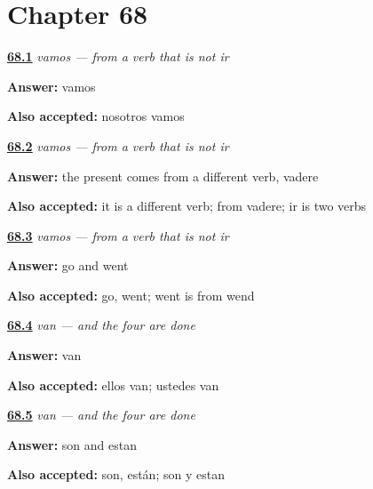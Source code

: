 \section*{Chapter 68}

\noindent\begin{minipage}[t]{\linewidth}
\raggedright
\hyperlink{review-ES-C10-vamos-form}{\textbf{68.1}} \emph{vamos — from a verb that is not \emph{ir}}\par
\small \textbf{Answer:} vamos\par
\footnotesize \textbf{Also accepted:} nosotros vamos
\end{minipage}\par\medskip

\noindent\begin{minipage}[t]{\linewidth}
\raggedright
\hyperlink{review-ES-C10-vamos-why}{\textbf{68.2}} \emph{vamos — from a verb that is not \emph{ir}}\par
\small \textbf{Answer:} the present comes from a different verb, vadere\par
\footnotesize \textbf{Also accepted:} it is a different verb; from vadere; ir is two verbs
\end{minipage}\par\medskip

\noindent\begin{minipage}[t]{\linewidth}
\raggedright
\hyperlink{review-ES-C10-vamos-english}{\textbf{68.3}} \emph{vamos — from a verb that is not \emph{ir}}\par
\small \textbf{Answer:} go and went\par
\footnotesize \textbf{Also accepted:} go, went; went is from wend
\end{minipage}\par\medskip

\noindent\begin{minipage}[t]{\linewidth}
\raggedright
\hyperlink{review-ES-C10-van-form}{\textbf{68.4}} \emph{van — and the four are done}\par
\small \textbf{Answer:} van\par
\footnotesize \textbf{Also accepted:} ellos van; ustedes van
\end{minipage}\par\medskip

\noindent\begin{minipage}[t]{\linewidth}
\raggedright
\hyperlink{review-ES-C10-van-four}{\textbf{68.5}} \emph{van — and the four are done}\par
\small \textbf{Answer:} son and estan\par
\footnotesize \textbf{Also accepted:} son, están; son y estan
\end{minipage}\par\medskip

